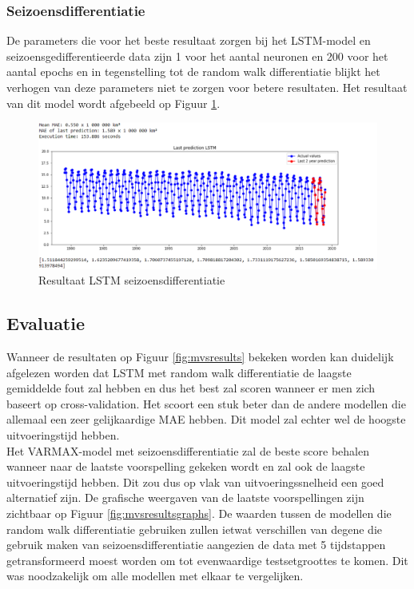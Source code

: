 \subsubsection{Seizoensdifferentiatie}
De parameters die voor het beste resultaat zorgen bij het LSTM-model en seizoensgedifferentieerde data zijn 1 voor het aantal neuronen en 200 voor het aantal epochs en in tegenstelling tot de random walk differentiatie blijkt het verhogen van deze parameters niet te zorgen voor betere resultaten. Het resultaat van dit model wordt afgebeeld op Figuur \ref{fig:mvslstmsdiff}.


\begin{figure}[!h]
    \centering
    \caption{Resultaat LSTM seizoensdifferentiatie}
    \label{fig:mvslstmsdiff}
    \includegraphics[width=1\linewidth]{mv_s_lstm_s_diff}
\end{figure}

\clearpage

\subsection{Evaluatie}
Wanneer de resultaten op Figuur \ref{fig:mvsresults} bekeken worden kan duidelijk afgelezen worden dat LSTM met random walk differentiatie de laagste gemiddelde fout zal hebben en dus het best zal scoren wanneer er men zich baseert op cross-validation. Het scoort een stuk beter dan de andere modellen die allemaal een zeer gelijkaardige MAE hebben. Dit model zal echter wel de hoogste uitvoeringstijd hebben. \\

Het VARMAX-model met seizoensdifferentiatie zal de beste score behalen wanneer naar de laatste voorspelling gekeken wordt en zal ook de laagste uitvoeringstijd hebben. Dit zou dus op vlak van uitvoeringssnelheid een goed alternatief zijn. De grafische weergaven van de laatste voorspellingen zijn zichtbaar op Figuur \ref{fig:mvsresultsgraphs}. De waarden tussen de modellen die random walk differentiatie gebruiken zullen ietwat verschillen van degene die gebruik maken van seizoensdifferentiatie aangezien de data met 5 tijdstappen getransformeerd moest worden om tot evenwaardige testsetgroottes te komen. Dit was noodzakelijk om alle modellen met elkaar te vergelijken.


